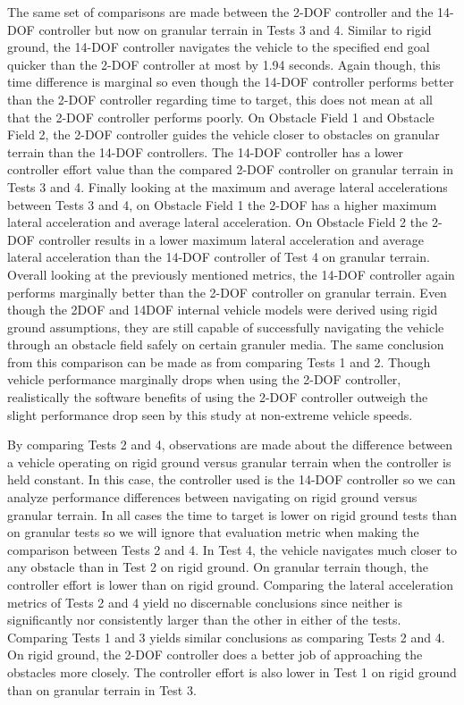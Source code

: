 \documentclass[12pt,twocolumn]{article}
\newcommand{\CHRONO}{{\sffamily{{Chrono}}}}
\begin{document}
The same set of comparisons are made between the 2-DOF controller and the 14-DOF controller but now on granular terrain in Tests 3 and 4. Similar to rigid ground, the 14-DOF controller navigates the {\CHRONO} vehicle to the specified end goal quicker than the 2-DOF controller at most by 1.94 seconds. Again though, this time difference is marginal so even though the 14-DOF controller performs better than the 2-DOF controller regarding time to target, this does not mean at all that the 2-DOF controller performs poorly. On Obstacle Field 1 and Obstacle Field 2, the 2-DOF controller guides the vehicle closer to obstacles on granular terrain than the 14-DOF controllers. The 14-DOF controller has a lower controller effort value than the compared 2-DOF controller on granular terrain in Tests 3 and 4. Finally looking at the maximum and average lateral accelerations between Tests 3 and 4, on Obstacle Field 1 the 2-DOF has a higher maximum lateral acceleration and average lateral acceleration. On Obstacle Field 2 the 2-DOF controller results in a lower maximum lateral acceleration and average lateral acceleration than the 14-DOF controller of Test 4 on granular terrain. Overall looking at the previously mentioned metrics, the 14-DOF controller again performs marginally better than the 2-DOF controller on granular terrain. Even though the 2DOF and 14DOF internal vehicle models were derived using rigid ground assumptions, they are still capable of successfully navigating the {\CHRONO} vehicle through an obstacle field safely on certain granuler media. The same conclusion from this comparison can be made as from comparing Tests 1 and 2. Though vehicle performance marginally drops when using the 2-DOF controller, realistically the software benefits of using the 2-DOF controller outweigh the slight performance drop seen by this study at non-extreme vehicle speeds.

By comparing Tests 2 and 4, observations are made about the difference between a vehicle operating on rigid ground versus granular terrain when the controller is held constant. In this case, the controller used is the 14-DOF controller so we can analyze performance differences between navigating on rigid ground versus granular terrain. In all cases the time to target is lower on rigid ground tests than on granular tests so we will ignore that evaluation metric when making the comparison between Tests 2 and 4. In Test 4, the vehicle navigates much closer to any obstacle than in Test 2 on rigid ground. On granular terrain though, the controller effort is lower than on rigid ground. Comparing the lateral acceleration metrics of Tests 2 and 4 yield no discernable conclusions since neither is significantly nor consistently larger than the other in either of the tests. Comparing Tests 1 and 3 yields similar conclusions as comparing Tests 2 and 4. On rigid ground, the 2-DOF controller does a better job of approaching the obstacles more closely. The controller effort is also lower in Test 1 on rigid ground than on granular terrain in Test 3.
\end{document}
